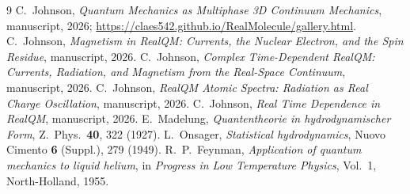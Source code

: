 \documentclass[11pt]{article}
\begin{document}
\begin{thebibliography}{9}
 C.~Johnson, \emph{Quantum Mechanics as Multiphase 3D Continuum Mechanics}, manuscript,
2026; \url{https://claes542.github.io/RealMolecule/gallery.html}.
 C.~Johnson, \emph{Magnetism in RealQM: Currents, the Nuclear Electron, and the Spin
Residue}, manuscript, 2026.
 C.~Johnson, \emph{Complex Time-Dependent RealQM: Currents, Radiation, and Magnetism
from the Real-Space Continuum}, manuscript, 2026.
 C.~Johnson, \emph{RealQM Atomic Spectra: Radiation as Real Charge Oscillation}, manuscript,
2026.
 C.~Johnson, \emph{Real Time Dependence in RealQM}, manuscript, 2026.
 E.~Madelung, \emph{Quantentheorie in hydrodynamischer Form}, Z.\ Phys.\ \textbf{40}, 322
(1927).
 L.~Onsager, \emph{Statistical hydrodynamics}, Nuovo Cimento \textbf{6} (Suppl.), 279 (1949).
 R.~P.~Feynman, \emph{Application of quantum mechanics to liquid helium}, in \emph{Progress
in Low Temperature Physics}, Vol.~1, North-Holland, 1955.
\end{thebibliography}
\end{document}
